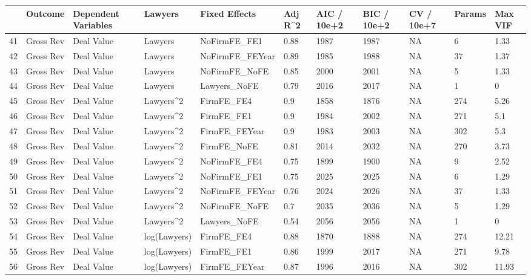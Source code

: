 \begin{table}[ht]
\centering
\begin{tabular}{rllllllllll}
  \hline
 & Outcome & Dependent Variables & Lawyers & Fixed Effects & Adj R^2 & AIC / 10e+2 & BIC / 10e+2 & CV / 10e+7 & Params & Max VIF \\ 
  \hline
41 & Gross Rev & Deal Value & Lawyers & NoFirmFE\_FE1 & 0.88 & 1987 & 1987 & NA & 6 & 1.33 \\ 
  42 & Gross Rev & Deal Value & Lawyers & NoFirmFE\_FEYear & 0.89 & 1985 & 1988 & NA & 37 & 1.37 \\ 
  43 & Gross Rev & Deal Value & Lawyers & NoFirmFE\_NoFE & 0.85 & 2000 & 2001 & NA & 5 & 1.33 \\ 
  44 & Gross Rev & Deal Value & Lawyers & Lawyers\_NoFE & 0.79 & 2016 & 2017 & NA & 1 & 0 \\ 
  45 & Gross Rev & Deal Value & Lawyers^2 & FirmFE\_FE4 & 0.9 & 1858 & 1876 & NA & 274 & 5.26 \\ 
  46 & Gross Rev & Deal Value & Lawyers^2 & FirmFE\_FE1 & 0.9 & 1984 & 2002 & NA & 271 & 5.1 \\ 
  47 & Gross Rev & Deal Value & Lawyers^2 & FirmFE\_FEYear & 0.9 & 1983 & 2003 & NA & 302 & 5.3 \\ 
  48 & Gross Rev & Deal Value & Lawyers^2 & FirmFE\_NoFE & 0.81 & 2014 & 2032 & NA & 270 & 3.73 \\ 
  49 & Gross Rev & Deal Value & Lawyers^2 & NoFirmFE\_FE4 & 0.75 & 1899 & 1900 & NA & 9 & 2.52 \\ 
  50 & Gross Rev & Deal Value & Lawyers^2 & NoFirmFE\_FE1 & 0.75 & 2025 & 2025 & NA & 6 & 1.29 \\ 
  51 & Gross Rev & Deal Value & Lawyers^2 & NoFirmFE\_FEYear & 0.76 & 2024 & 2026 & NA & 37 & 1.33 \\ 
  52 & Gross Rev & Deal Value & Lawyers^2 & NoFirmFE\_NoFE & 0.7 & 2035 & 2036 & NA & 5 & 1.29 \\ 
  53 & Gross Rev & Deal Value & Lawyers^2 & Lawyers\_NoFE & 0.54 & 2056 & 2056 & NA & 1 & 0 \\ 
  54 & Gross Rev & Deal Value & log(Lawyers) & FirmFE\_FE4 & 0.88 & 1870 & 1888 & NA & 274 & 12.21 \\ 
  55 & Gross Rev & Deal Value & log(Lawyers) & FirmFE\_FE1 & 0.86 & 1999 & 2017 & NA & 271 & 9.78 \\ 
  56 & Gross Rev & Deal Value & log(Lawyers) & FirmFE\_FEYear & 0.87 & 1996 & 2016 & NA & 302 & 11.93 \\ 

\end{tabular}
\end{table}
